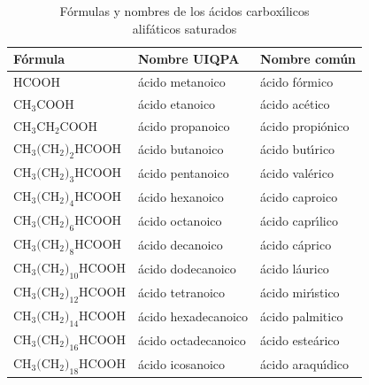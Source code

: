 \begin{table}[bht]
\caption[\'acidos carbox\'{\i}licos]{F\'ormulas y nombres de los \'acidos
carbox\'{\i}licos\\ alif\'aticos saturados}
\label{grasos}
{\small \begin{tabular}{lll}\hline
\textbf{F\'ormula}&\textbf{Nombre UIQPA}& \textbf{Nombre com\'un}\\ \hline
HCOOH                 &\'acido metanoico      &\'acido f\'ormico\\
CH$_3$COOH            &\'acido etanoico       &\'acido ac\'etico\\
CH$_3$CH$_2$COOH      &\'acido propanoico      &\'acido propi\'onico\\
CH$_3($CH$_2)_2$HCOOH &\'acido butanoico      &\'acido but\'{\i}rico\\
CH$_3($CH$_2)_3$HCOOH &\'acido pentanoico     &\'acido val\'erico\\
CH$_3($CH$_2)_4$HCOOH &\'acido hexanoico      &\'acido caproico\\
CH$_3($CH$_2)_6$HCOOH &\'acido octanoico      &\'acido capr\'{\i}lico\\
CH$_3($CH$_2)_8$HCOOH &\'acido decanoico      &\'acido c\'aprico\\
CH$_3($CH$_2)_{10}$HCOOH&\'acido dodecanoico    &\'acido l\'aurico\\
CH$_3($CH$_2)_{12}$HCOOH&\'acido tetranoico     &\'acido mir\'{\i}stico\\
CH$_3($CH$_2)_{14}$HCOOH&\'acido hexadecanoico  &\'acido palmitico\\
CH$_3($CH$_2)_{16}$HCOOH&\'acido octadecanoico  &\'acido este\'arico\\
CH$_3($CH$_2)_{18}$HCOOH&\'acido icosanoico     &\'acido
araqu\'{\i}dico\\\hline
\end{tabular}}
\end{table}

